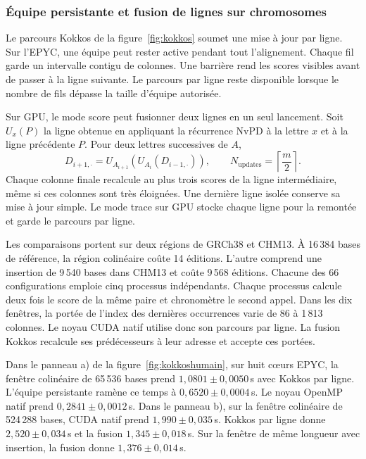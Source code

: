 \subsubsection{Équipe persistante et fusion de lignes sur chromosomes}\label{sec:kokkoshumain}
Le parcours Kokkos de la figure~\ref{fig:kokkos} soumet une mise à jour par ligne. Sur l'EPYC, une équipe peut rester active pendant tout l'alignement. Chaque fil garde un intervalle contigu de colonnes. Une barrière rend les scores visibles avant de passer à la ligne suivante. Le parcours par ligne reste disponible lorsque le nombre de fils dépasse la taille d'équipe autorisée.

Sur GPU, le mode score peut fusionner deux lignes en un seul lancement. Soit \(U_x(P)\) la ligne obtenue en appliquant la récurrence NvPD à la lettre \(x\) et à la ligne précédente \(P\). Pour deux lettres successives de \(A\),
\[
 D_{i+1,\cdot}=U_{A_{i+1}}\!\left(U_{A_i}(D_{i-1,\cdot})\right),\qquad
 N_{\mathrm{updates}}=\left\lceil\frac{m}{2}\right\rceil .
\]
Chaque colonne finale recalcule au plus trois scores de la ligne intermédiaire, même si ces colonnes sont très éloignées. Une dernière ligne isolée conserve sa mise à jour simple. Le mode trace sur GPU stocke chaque ligne pour la remontée et garde le parcours par ligne.

Les comparaisons portent sur deux régions de GRCh38 et CHM13. À 16\,384 bases de référence, la région colinéaire coûte 14 éditions. L'autre comprend une insertion de 9\,540 bases dans CHM13 et coûte 9\,568 éditions. Chacune des 66 configurations emploie cinq processus indépendants. Chaque processus calcule deux fois le score de la même paire et chronomètre le second appel. Dans les dix fenêtres, la portée de l'index des dernières occurrences varie de 86 à 1\,813 colonnes. Le noyau CUDA natif utilise donc son parcours par ligne. La fusion Kokkos recalcule ses prédécesseurs à leur adresse et accepte ces portées.

Dans le panneau a) de la figure~\ref{fig:kokkoshumain}, sur huit cœurs EPYC, la fenêtre colinéaire de 65\,536 bases prend \(1{,}0801\pm0{,}0050\)\,s avec Kokkos par ligne. L'équipe persistante ramène ce temps à \(0{,}6520\pm0{,}0004\)\,s. Le noyau OpenMP natif prend \(0{,}2841\pm0{,}0012\)\,s. Dans le panneau b), sur la fenêtre colinéaire de 524\,288 bases, CUDA natif prend \(1{,}990\pm0{,}035\)\,s. Kokkos par ligne donne \(2{,}520\pm0{,}034\)\,s et la fusion \(1{,}345\pm0{,}018\)\,s. Sur la fenêtre de même longueur avec insertion, la fusion donne \(1{,}376\pm0{,}014\)\,s.

